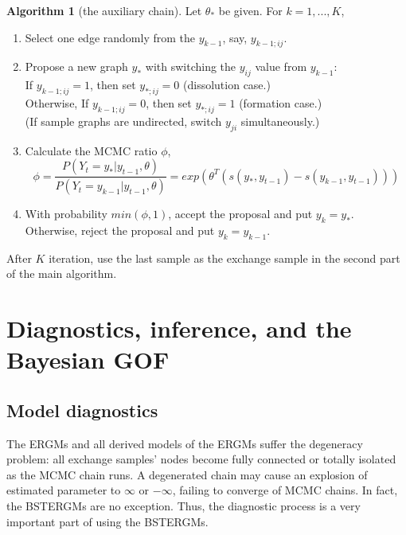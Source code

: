 \documentclass[a4paper, 11pt]{report}
\theoremstyle{definition}
\newtheorem{algo}{Algorithm}[section]
\begin{document}
\begin{algo}[the auxiliary chain]
Let $\theta_*$ be given. For $k=1,...,K$,
\begin{enumerate}
    \item Select one edge randomly from the $y_{k-1}$, say, $y_{k-1;ij}$.
    \item Propose a new graph $y_*$ with switching the $y_{ij}$ value from $y_{k-1}$: 
    \\ If $y_{k-1;ij}=1$, then set $y_{*;ij}=0$ (dissolution case.) 
    \\ Otherwise, If $y_{k-1;ij}=0$, then set $y_{*;ij}=1$ (formation case.)
    \\ (If sample graphs are undirected, switch $y_{ji}$ simultaneously.)
    \item Calculate the MCMC ratio $\phi$,
    \[\phi = \frac{P(Y_t=y_*|y_{t-1},\theta)}{P(Y_t=y_{k-1}|y_{t-1},\theta)}= exp(\theta^T (s(y_{*},y_{t-1}) - s(y_{k-1},y_{t-1})))\]
    \item With probability $min(\phi,1)$, accept the proposal and put $y_k=y_*$.\\
        Otherwise, reject the proposal and put $y_k=y_{k-1}$.
\end{enumerate}
\end{algo}

After $K$ iteration, use the last sample as the exchange sample in the second part of the main algorithm.



\chapter{Diagnostics, inference, and the Bayesian GOF} \label{Chapter5}

\section{Model diagnostics}
The ERGMs and all derived models of the ERGMs suffer the degeneracy problem: 
all exchange samples' nodes become fully connected or totally isolated as the MCMC chain runs. 
A degenerated chain may cause an explosion of estimated parameter to $\infty$ or $-\infty$,
failing to converge of MCMC chains. In fact, the BSTERGMs are no exception. 
Thus, the diagnostic process is a very important part of using the BSTERGMs.
\end{document}
